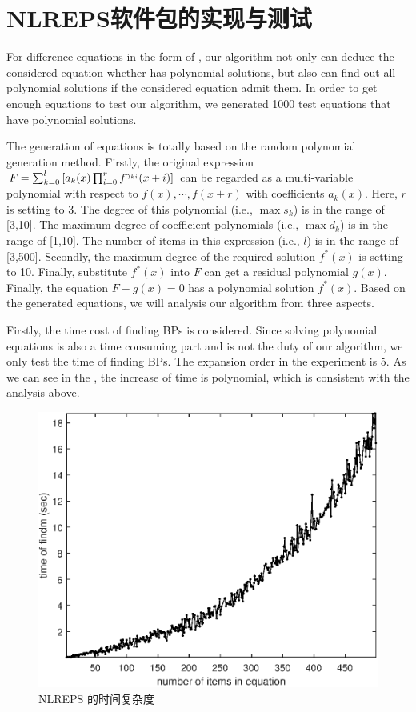 \section{NLREPS软件包的实现与测试}

For difference equations in the form of , our algorithm not only can deduce the considered equation whether has polynomial solutions, but also can find out all polynomial solutions if the considered equation admit them. In order to get enough equations to test our algorithm, we generated 1000 test equations that have polynomial solutions.

The generation of equations is totally based on the random polynomial generation method. Firstly, the original expression $F=\sum_{k=0}^l{\left[a_k(x)\prod_{i=0}^r{f^{\gamma_{ki}}(x+i)}\right]}$ can be regarded as a multi-variable polynomial with respect to $f(x),\cdots,f(x+r)$ with coefficients $a_k(x)$. Here, $r$ is setting to 3. The degree of this polynomial (i.e., $\max s_k$) is in the range of [3,10]. The maximum degree of coefficient polynomials (i.e., $\max d_k$) is in the range of [1,10]. The number of items in this expression (i.e., $l$) is in the range of [3,500]. Secondly, the maximum degree of the required solution $f^*(x)$ is setting to 10. Finally, substitute $f^*(x)$ into $F$ can get a residual polynomial $g(x)$. Finally, the equation $F-g(x)=0$ has a polynomial solution $f^*(x)$. Based on the generated equations, we will analysis our algorithm from three aspects.

Firstly, the time cost of finding BPs is considered. Since solving polynomial equations is also a time consuming part and is not the duty of our algorithm, we only test the time of finding BPs. The expansion order in the experiment is 5. As we can see in the , the  increase of time is polynomial, which is consistent with the analysis above.
\begin{figure}[H]
\centering
\includegraphics[width=\figwidth]{fig/nlt.eps}
\caption{NLREPS 的时间复杂度}
\label{t-findm}
\end{figure}

